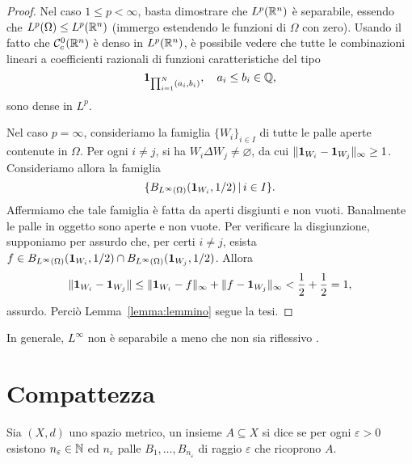 \begin{proof}
	Nel caso $1 \leq p < \infty$, basta dimostrare che $L^p(\mathbb{R}^n)$ è separabile, essendo che $L^p(\Omega) \leq L^p(\mathbb{R}^n)$ (immergo estendendo le funzioni di $\Omega$ con zero). Usando il fatto che $\mathcal{C}^0_c(\mathbb{R}^n)$ è denso in $L^p(\mathbb{R}^n)$, è possibile vedere che tutte le combinazioni lineari a coefficienti razionali di funzioni caratteristiche del tipo
	\begin{equation*}
		{\boldsymbol{1}}_{\prod_{i=1}^N (a_i,b_i)}, \quad a_i \leq b_i \in \mathbb{Q},
	\end{equation*}
	sono dense in $L^p$.

	Nel caso $p=\infty$, consideriamo la famiglia $\{W_i\}_{i \in I}$ di tutte le palle aperte contenute in $\Omega$. Per ogni $i \neq j$, si ha $W_i \Delta W_j \neq \varnothing$, da cui $\|{\boldsymbol{1}}_{W_i} - {\boldsymbol{1}}_{W_j}\|_\infty \geq 1$. Consideriamo allora la famiglia
	\begin{equation*}
		\{ B_{L^\infty(\Omega)}({\boldsymbol{1}}_{W_i}, 1/2) \,|\, i \in I\}.
	\end{equation*}
	Affermiamo che tale famiglia è fatta da aperti disgiunti e non vuoti. Banalmente le palle in oggetto sono aperte e non vuote. Per verificare la disgiunzione, supponiamo per assurdo che, per certi $i \neq j$, esista $f \in B_{L^\infty(\Omega)}({\boldsymbol{1}}_{W_i}, 1/2) \cap B_{L^\infty(\Omega)}({\boldsymbol{1}}_{W_j}, 1/2)$. Allora
	\begin{equation*}
			\| {\boldsymbol{1}}_{W_i} - {\boldsymbol{1}}_{W_j} \| \leq \|{\boldsymbol{1}}_{W_i} - f\|_\infty + \|f-{\boldsymbol{1}}_{W_j}\|_\infty < \frac12 + \frac12 = 1,
	\end{equation*}
	assurdo. Perciò Lemma~\ref{lemma:lemmino} segue la tesi.
\end{proof}

\begin{remark}
	In generale, $L^\infty$ non è separabile a meno che non sia riflessivo \cite[103]{brezis2010functional}.
\end{remark}

\section{Compattezza}
\begin{definition}
	Sia $(X,d)$ uno spazio metrico, un insieme $A \subseteq X$ si dice  se per ogni $\varepsilon > 0$ esistono $n_\varepsilon \in \mathbb{N}$ ed $n_\varepsilon$ palle $B_1, \ldots, B_{n_\varepsilon}$ di raggio $\varepsilon$ che ricoprono $A$.
\end{definition}

